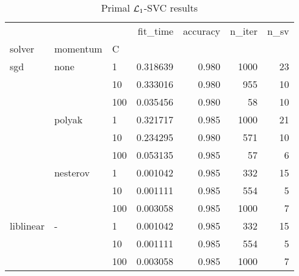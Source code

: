 \begin{table}[H]
\centering
\caption{Primal $\protect \mathcal{L}_1$-SVC results}
\label{primal_l1_svc_cv_results}
\begin{tabular}{lllrrrr}
\toprule
          &   &     &  fit\_time &  accuracy &  n\_iter &  n\_sv \\
solver & momentum & C &           &           &         &       \\
\midrule
sgd & none & 1   &  0.318639 &     0.980 &    1000 &    23 \\
          &   & 10  &  0.333016 &     0.980 &     955 &    10 \\
          &   & 100 &  0.035456 &     0.980 &      58 &    10 \\
          & polyak & 1   &  0.321717 &     0.985 &    1000 &    21 \\
          &   & 10  &  0.234295 &     0.980 &     571 &    10 \\
          &   & 100 &  0.053135 &     0.985 &      57 &     6 \\
          & nesterov & 1   &  0.001042 &     0.985 &     332 &    15 \\
          &   & 10  &  0.001111 &     0.985 &     554 &     5 \\
          &   & 100 &  0.003058 &     0.985 &    1000 &     7 \\
liblinear & - & 1   &  0.001042 &     0.985 &     332 &    15 \\
          &   & 10  &  0.001111 &     0.985 &     554 &     5 \\
          &   & 100 &  0.003058 &     0.985 &    1000 &     7 \\
\bottomrule
\end{tabular}
\end{table}
